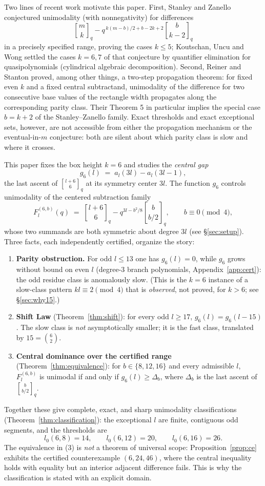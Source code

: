\documentclass[11pt,reqno]{article}
\theoremstyle{definition}
\newcommand{\ggbrack}[2]{\genfrac{[}{]}{0pt}{}{#1}{#2}_q}
\begin{document}
Two lines of recent work motivate this paper. First, Stanley and Zanello \cite{SZ} conjectured unimodality (with nonnegativity) for differences
\[
\ggbrack{m}{k}-q^{\,k(m-b)/2+b-2k+2}\ggbrack{b}{k-2}
\]
in a precisely specified range, proving the cases $k\le 5$; Koutschan, Uncu and Wong \cite{KUW} settled the cases $k=6,7$ of that conjecture by quantifier elimination for quasipolynomials (cylindrical algebraic decomposition). Second, Reiner and Stanton \cite{RS} proved, among other things, a two-step propagation theorem: for fixed even $k$ and a fixed central subtractand, unimodality of the difference for two consecutive base values of the rectangle width propagates along the corresponding parity class. Their Theorem 5 in particular implies the special case $b=k+2$ of the Stanley--Zanello family. Exact thresholds and exact exceptional sets, however, are not accessible from either the propagation mechanism or the eventual-in-$m$ conjecture: both are silent about which parity class is slow and where it crosses.

This paper fixes the box height $k=6$ and studies the \emph{central gap}
\[
g_6(l)\;=\;a_l(3l)-a_l(3l-1),
\]
the last ascent of $\ggbrack{l+6}{6}$ at its symmetry center $3l$. The function $g_6$ controls unimodality of the centered subtraction family
\[
F^{(6,b)}_l(q)\;=\;\ggbrack{l+6}{6}-q^{3l-b^2/8}\ggbrack{b}{b/2},\qquad b\equiv 0\pmod 4,
\]
whose two summands are both symmetric about degree $3l$ (see \S\ref{sec:setup}). Three facts, each independently certified, organize the story:
\begin{enumerate}
\item \textbf{Parity obstruction.} For odd $l\le 13$ one has $g_6(l)=0$, while $g_6$ grows without bound on even $l$ (degree-$3$ branch polynomials, Appendix~\ref{app:cert}): the odd residue class is anomalously slow. (This is the $k=6$ instance of a slow-class pattern $kl\equiv 2\pmod 4$ that is \emph{observed}, not proved, for $k>6$; see \S\ref{sec:why15}.)
\item \textbf{Shift Law} (Theorem~\ref{thm:shift}): for every odd $l\ge17$, $g_6(l)=g_6(l-15)$. The slow class is \emph{not} asymptotically smaller; it is the fast class, translated by $15=\binom 62$.
\item \textbf{Central dominance over the certified range} (Theorem~\ref{thm:equivalence}): for $b\in\{8,12,16\}$ and every admissible $l$, $F^{(6,b)}_l$ is unimodal if and only if $g_6(l)\ge\Delta_b$, where $\Delta_b$ is the last ascent of $\ggbrack{b}{b/2}$.
\end{enumerate}
Together these give complete, exact, and sharp unimodality classifications (Theorem~\ref{thm:classification}): the exceptional $l$ are finite, contiguous odd segments, and the thresholds are
\[
l_0(6,8)=14,\qquad l_0(6,12)=20,\qquad l_0(6,16)=26 .
\]
The equivalence in (3) is \emph{not} a theorem of universal scope: Proposition~\ref{prop:ce} exhibits the certified counterexample $(6,24,46)$, where the central inequality holds with equality but an interior adjacent difference fails. This is why the classification is stated with an explicit domain.
\end{document}
